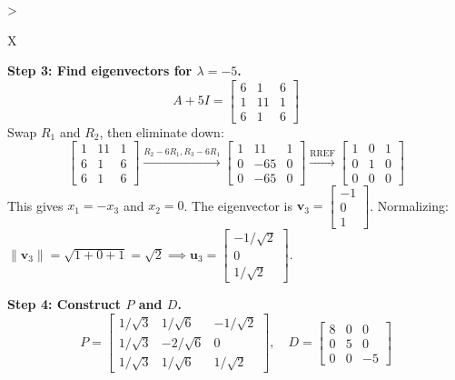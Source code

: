 \documentclass[11pt, letterpaper]{article}
\theoremstyle{definition}
\theoremstyle{remark}
\begin{document}
\begin{tabularx}{\textwidth}{>{\raggedright\arraybackslash}X}
\textbf{Step 3: Find eigenvectors for $\lambda = -5$.}
\[ A + 5I = \begin{bmatrix} 6 & 1 & 6 \\ 1 & 11 & 1 \\ 6 & 1 & 6 \end{bmatrix} \]
Swap $R_1$ and $R_2$, then eliminate down:
\[ \begin{bmatrix} 1 & 11 & 1 \\ 6 & 1 & 6 \\ 6 & 1 & 6 \end{bmatrix} \xrightarrow{R_2-6R_1, R_3-6R_1} \begin{bmatrix} 1 & 11 & 1 \\ 0 & -65 & 0 \\ 0 & -65 & 0 \end{bmatrix} \xrightarrow{\text{RREF}} \begin{bmatrix} 1 & 0 & 1 \\ 0 & 1 & 0 \\ 0 & 0 & 0 \end{bmatrix} \]
This gives $x_1 = -x_3$ and $x_2 = 0$. The eigenvector is $\mathbf{v}_3 = \begin{bmatrix} -1 \\ 0 \\ 1 \end{bmatrix}$.
Normalizing: $\|\mathbf{v}_3\| = \sqrt{1+0+1} = \sqrt{2} \implies \mathbf{u}_3 = \begin{bmatrix} -1/\sqrt{2} \\ 0 \\ 1/\sqrt{2} \end{bmatrix}$.

\textbf{Step 4: Construct $P$ and $D$.}
\[ P = \begin{bmatrix} 1/\sqrt{3} & 1/\sqrt{6} & -1/\sqrt{2} \\ 1/\sqrt{3} & -2/\sqrt{6} & 0 \\ 1/\sqrt{3} & 1/\sqrt{6} & 1/\sqrt{2} \end{bmatrix}, \quad D = \begin{bmatrix} 8 & 0 & 0 \\ 0 & 5 & 0 \\ 0 & 0 & -5 \end{bmatrix} \] \\
\bottomrule
\end{tabularx}
\vspace{1em}
\end{document}
